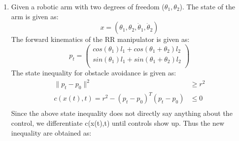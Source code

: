 \begin{enumerate}
\item Given a robotic arm with two degrees of freedom ($\theta_1, \theta_2$). The state of the arm is given as:
  \begin{equation*}
   x = (\theta_1, \theta_2, \dot \theta_1, \dot \theta_2)
  \end{equation*}
  The forward kinematics of the RR manipulator is given as:
    \begin{equation*}
     p_t = \begin{pmatrix}
            cos(\theta_1) l_1 + cos(\theta_1 + \theta_2) l_2 \\
            sin(\theta_1) l_1 + sin(\theta_1 + \theta_2) l_2 \\
           \end{pmatrix}
    \end{equation*}
   The state inequality for obstacle avoidance is given as:
     \begin{align*}
      \lVert p_t - p_0 \rVert^2 &\ge r^2 \\
      c(x(t),t) = r^2 - (p_t - p_0)^T (p_t - p_0) &\le 0 \\
     \end{align*}
    Since the above state inequality does not directly say anything about the control, we differentiate c(x(t),t) until controls
show up. Thus the new inequality are obtained as:
  


\end{enumerate}
